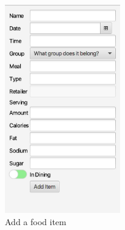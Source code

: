 \documentclass{scrreprt}
\begin{document}
\begin{figure}[!htbp]
	\centering
	\includegraphics[width=5cm]{pictures/add-food-item.png}
	\caption{Add a food item}
\end{figure}

\FloatBarrier
\end{document}
